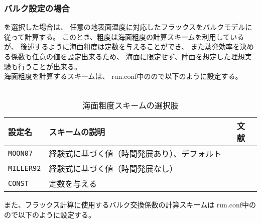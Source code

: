 \subsubsection{バルク設定の場合}
を選択した場合は、
任意の地表面温度に対応したフラックスをバルクモデルに従って計算する。
このとき、粗度は海面粗度の計算スキームを利用しているが、
後述するように海面粗度は定数を与えることができ、
また蒸発効率を決める係数も任意の値を設定出来るため、
海面に限定せず、陸面を想定した理想実験も行うことが出来る。\\

海面粗度を計算するスキームは、
run.conf中のので以下のように設定する。\\

\\

\begin{table}[h]
\begin{center}
  \caption{海面粗度スキームの選択肢}
  \label{tab:nml_roughness}
  \begin{tabularx}{150mm}{llX} \hline
    \rowcolor[gray]{0.9}  設定名 & スキームの説明 & 文献 \\ \hline
      \verb|MOON07|   & 経験式に基づく値（時間発展あり）、デフォルト　& \citet{moon_2007} \\
      \verb|MILLER92| & 経験式に基づく値（時間発展なし）　　　　　　　& \citet{miller_1992} \\
      \verb|CONST|    & 定数を与える & \\
    \hline
  \end{tabularx}
\end{center}
\end{table}

また、フラックス計算に使用するバルク交換係数の計算スキームは
run.conf中のので以下のように設定する。\\

\\

